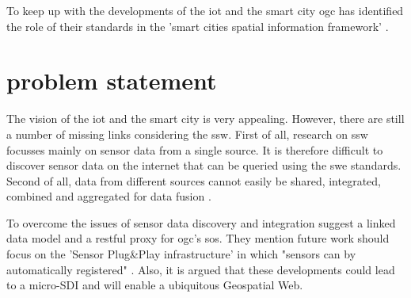 To keep up with the developments of the \ac{iot} and the smart city \ac{ogc} has identified the role of their standards in the 'smart cities spatial information framework' \cite{SC:OGC}.  

\section{problem statement}
The vision of the \ac{iot} and the smart city is very appealing. However, there are still a number of missing links considering the \ac{ssw}. First of all, research on \ac{ssw} focusses mainly on sensor data from a single source. It is therefore difficult to discover sensor data on the internet that can be queried using the \ac{swe} standards. Second of all, data from different sources cannot easily be shared, integrated, combined and aggregated for data fusion \citep{SSW:Wang, SSW:Ji, SSW:Corcho}. 

To overcome the issues of sensor data discovery and integration \cite{SSW:Janowicz} suggest a linked data model and a \ac{rest}ful proxy for \ac{ogc}’s \ac{sos}. They mention future work should focus on the 'Sensor Plug\&Play infrastructure' in which "sensors can by automatically registered" \cite[p. 21]{SSW:Janowicz}. Also, it is argued that these developments could lead to a micro-SDI and will enable a ubiquitous Geospatial Web. 

